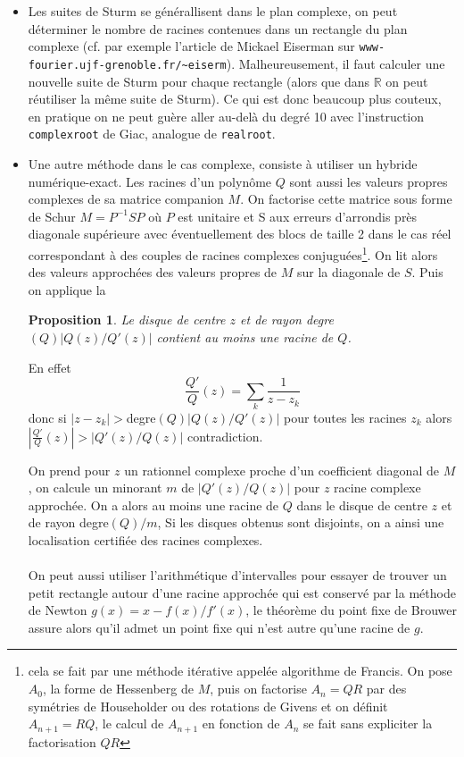 \documentclass[a4paper,11pt]{article}
\newtheorem{prop}[thm]{Proposition}
\begin{document}
\begin{giacjshere}
\begin{itemize}
On peut m\^eme montrer que $r(P)$ et $\sigma(P)$ sont de m\^eme
parit\'e.
L'algorithme VAS utilise ce r\'esultat et des changements de variable
homographique $x \rightarrow \frac{ax+b}{cx+d}$ pour isoler les racines.
\item Les suites de Sturm se g\'en\'erallisent dans le plan complexe, on
peut d\'eterminer le nombre de racines contenues dans un
rectangle du plan complexe (cf. par exemple l'article
de Mickael Eiserman sur \verb|www-fourier.ujf-grenoble.fr/~eiserm|). 
Malheureusement, il faut calculer une nouvelle suite de Sturm
pour chaque rectangle (alors que dans $\mathbb{R}$ on peut r\'eutiliser la
m\^eme suite de Sturm). Ce qui est donc beaucoup plus couteux,
en pratique on ne peut gu\`ere aller au-del\`a du degr\'e 10 avec
l'instruction \verb|complexroot| de Giac, analogue de \verb|realroot|.
\item Une autre m\'ethode dans le cas complexe, 
consiste \`a utiliser
un hybride num\'erique-exact. Les racines d'un polyn\^ome $Q$
sont aussi les valeurs
propres complexes de sa matrice companion $M$. On factorise cette matrice
sous forme de Schur $M=P^{-1} S P$ o\`u $P$ est unitaire
et S  aux erreurs d'arrondis pr\`es diagonale sup\'erieure 
avec \'eventuellement des blocs de taille
2 dans le cas r\'eel correspondant \`a des couples de racines
complexes conjugu\'ees\footnote{cela se fait
par une m\'ethode it\'erative appel\'ee algorithme
de Francis. On pose $A_0$, la forme
de Hessenberg de $M$, puis on 
factorise $A_n=QR$ par des sym\'etries de Householder ou
des rotations de Givens et on d\'efinit
$A_{n+1}=RQ$, le calcul de $A_{n+1}$ en fonction de $A_n$
se fait sans expliciter la factorisation $QR$}. On lit alors des valeurs approch\'ees des valeurs
propres de $M$ sur la diagonale de $S$. Puis on applique la
\begin{prop}
Le disque de centre $z$ et de rayon degre$(Q) |Q(z)/Q'(z)|$
contient au moins une racine de $Q$.
\end{prop}
En effet
\[ \frac{Q'}{Q}(z)= \sum_{k} \frac{1}{z-z_k}\]
donc si $|z-z_k| > $degre$(Q) |Q(z)/Q'(z)|$ pour toutes les racines $z_k$ alors
$|\frac{Q'}{Q}(z)| > |Q'(z)/Q(z)|$ contradiction.

On prend pour $z$ un rationnel complexe proche d'un coefficient
diagonal de $M$, on calcule un minorant $m$ de $|Q'(z)/Q(z)|$ 
pour $z$ racine complexe approch\'ee. On a alors au moins
une racine de $Q$ dans le disque de centre $z$ 
et de rayon degre$(Q)/m$, Si les disques obtenus sont
disjoints, on a ainsi une localisation certifi\'ee des racines
complexes.\\
\\
On peut aussi utiliser l'arithmétique d'intervalles pour
essayer de trouver un petit rectangle autour d'une racine approchée
qui est conservé par la méthode de Newton $g(x)=x-f(x)/f'(x)$,
le théorème du point fixe de Brouwer assure alors qu'il admet
un point fixe qui n'est autre qu'une racine de $g$.
\end{itemize}


\end{giacjshere}
\end{document}
